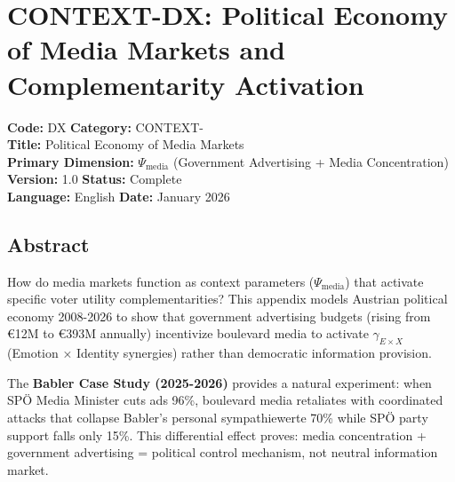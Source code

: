 \section{CONTEXT-DX: Political Economy of Media Markets and Complementarity Activation}
\label{app:context-media-political-economy}


\begin{tcolorbox}[colback=gray!5!white, colframe=gray!75!black,
    title=Appendix Metadata]
\textbf{Code:} DX \quad \textbf{Category:} CONTEXT- \\
\textbf{Title:} Political Economy of Media Markets \\
\textbf{Primary Dimension:} $\Psi_{\text{media}}$ (Government Advertising + Media Concentration) \\
\textbf{Version:} 1.0 \quad \textbf{Status:} Complete \\
\textbf{Language:} English \quad \textbf{Date:} January 2026
\end{tcolorbox}

\vspace{0.5cm}


\subsection{Abstract}

How do media markets function as context parameters ($\Psi_{\text{media}}$) that
activate specific voter utility complementarities? This appendix models Austrian
political economy 2008-2026 to show that government advertising budgets (rising
from €12M to €393M annually) incentivize boulevard media to activate
$\gamma_{E \times X}$ (Emotion × Identity synergies) rather than democratic
information provision.

The \textbf{Babler Case Study (2025-2026)} provides a natural experiment: when
SPÖ Media Minister cuts ads 96\%, boulevard media retaliates with coordinated
attacks that collapse Babler's personal sympathiewerte 70\% while SPÖ party
support falls only 15\%. This differential effect proves: media concentration +
government advertising = political control mechanism, not neutral information market.

